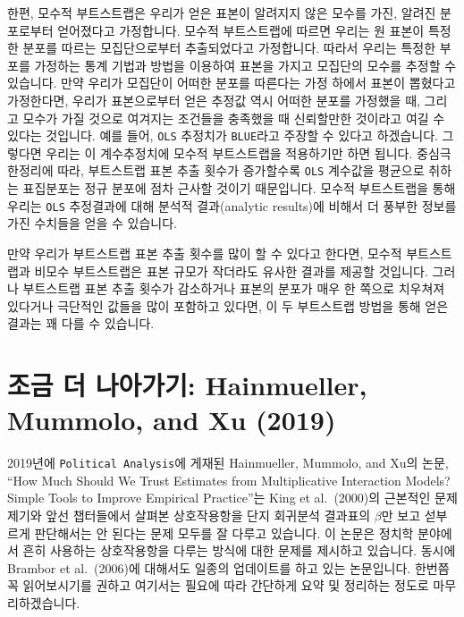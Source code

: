 \documentclass[
]{book}
\begin{document}
한편, 모수적 부트스트랩은 우리가 얻은 표본이 알려지지 않은 모수를 가진, 알려진 분포로부터 얻어졌다고 가정합니다. 모수적 부트스트랩에 따르면 우리는 원 표본이 특정한 분포를 따르는 모집단으로부터 추출되었다고 가정합니다. 따라서 우리는 특정한 부포를 가정하는 통계 기법과 방법을 이용하여 표본을 가지고 모집단의 모수를 추정할 수 있습니다. 만약 우리가 모집단이 어떠한 분포를 따른다는 가정 하에서 표본이 뽑혔다고 가정한다면, 우리가 표본으로부터 얻은 추정값 역시 어떠한 분포를 가정했을 때, 그리고 모수가 가질 것으로 여겨지는 조건들을 충족했을 때 신뢰할만한 것이라고 여길 수 있다는 것입니다. 예를 들어, \texttt{OLS} 추정치가 \texttt{BLUE}라고 주장할 수 있다고 하겠습니다. 그렇다면 우리는 이 계수추정치에 모수적 부트스트랩을 적용하기만 하면 됩니다. 중심극한정리에 따라, 부트스트랩 표본 추출 횟수가 증가할수록 \texttt{OLS} 계수값을 평균으로 취하는 표집분포는 정규 분포에 점차 근사할 것이기 때문입니다. 모수적 부트스트랩을 통해 우리는 \texttt{OLS} 추정결과에 대해 분석적 결과(analytic results)에 비해서 더 풍부한 정보를 가진 수치들을 얻을 수 있습니다.

만약 우리가 부트스트랩 표본 추출 횟수를 많이 할 수 있다고 한다면, 모수적 부트스트랩과 비모수 부트스트랩은 표본 규모가 작더라도 유사한 결과를 제공할 것입니다. 그러나 부트스트랩 표본 추출 횟수가 감소하거나 표본의 분포가 매우 한 쪽으로 치우쳐져 있다거나 극단적인 값들을 많이 포함하고 있다면, 이 두 부트스트랩 방법을 통해 얻은 결과는 꽤 다를 수 있습니다.

\hypertarget{uxc870uxae08-uxb354-uxb098uxc544uxac00uxae30-hainmueller-mummolo-and-xu-2019}{%
\section{조금 더 나아가기: Hainmueller, Mummolo, and Xu (2019)}\label{uxc870uxae08-uxb354-uxb098uxc544uxac00uxae30-hainmueller-mummolo-and-xu-2019}}

2019년에 \texttt{Political\ Analysis}에 게재된 Hainmueller, Mummolo, and Xu의 논문, ``How Much Should We Trust Estimates from Multiplicative Interaction Models? Simple Tools to Improve Empirical Practice''는 King et al.~(2000)의 근본적인 문제제기와 앞선 챕터들에서 살펴본 상호작용항을 단지 회귀분석 결과표의 \(\beta\)만 보고 섣부르게 판단해서는 안 된다는 문제 모두를 잘 다루고 있습니다. 이 논문은 정치학 분야에서 흔히 사용하는 상호작용항을 다루는 방식에 대한 문제를 제시하고 있습니다. 동시에 Brambor et al.~(2006)에 대해서도 일종의 업데이트를 하고 있는 논문입니다. 한번쯤 꼭 읽어보시기를 권하고 여기서는 필요에 따라 간단하게 요약 및 정리하는 정도로 마무리하겠습니다.
\end{document}
